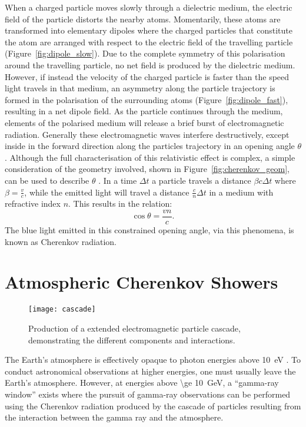 When a charged particle moves slowly through a dielectric medium, the electric field of the particle distorts the nearby atoms. Momentarily, these atoms are transformed into elementary dipoles where the charged particles that constitute the atom are arranged with respect to the electric field of the travelling particle (Figure~\ref{fig:dipole_slow}). Due to the complete symmetry of this polarisation around the travelling particle, no net field is produced by the dielectric medium. However, if instead the velocity of the charged particle is faster than the speed light travels in that medium, an asymmetry along the particle trajectory is formed in the polarisation of the surrounding atoms (Figure~\ref{fig:dipole_fast}), resulting in a net dipole field. As the particle continues through the medium, elements of the polarised medium will release a brief burst of electromagnetic radiation. Generally these electromagnetic waves interfere destructively, except inside in the forward direction along the particles trajectory in an opening angle $\theta$. Although the full characterisation of this relativistic effect is complex, a simple consideration of the geometry involved, shown in Figure~\ref{fig:cherenkov_geom}, can be used to describe $\theta$ \cite{Jelley1958a}. In a time $\Delta t$ a particle travels a distance $\beta c \Delta t$ where $\beta = \frac{v}{c}$, while the emitted light will travel a distance $\frac{c}{n} \Delta t$ in a medium with refractive index $n$. This results in the relation:
\begin{equation} \label{eq:cherenkov_angle}
\cos \theta = \frac{vn}{c}.
\end{equation}
The blue light emitted in this constrained opening angle, via this phenomena, is known as Cherenkov radiation.

\section{Atmospheric Cherenkov Showers} \label{section:cherenkov_shower_intro}

\begin{figure}
	\centering\texttt{[image: cascade]} 
	\caption[Production of a extended electromagnetic particle cascade.]{Production of a extended electromagnetic particle cascade, demonstrating the different components and interactions.}
	\label{fig:cascade}
\end{figure}

The Earth's atmosphere is effectively opaque to photon energies above \SI{10}{eV} \cite{Weekes2003}. To conduct astronomical observations at higher energies, one must usually leave the Earth's atmosphere. However, at energies above \SI{\ge 10}{GeV}, a ``gamma-ray window'' exists where the pursuit of gamma-ray observations can be performed using the Cherenkov radiation produced by the cascade of particles resulting from the interaction between the gamma ray and the atmosphere.

